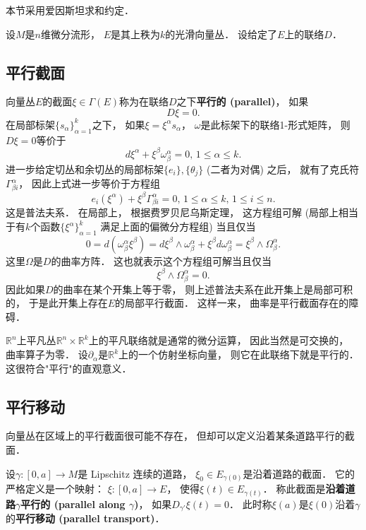 

本节采用爱因斯坦求和约定．

设$M$是$n$维微分流形， $E$是其上秩为$k$的光滑向量丛． 设给定了$E$上的联络$D$．

\subsection{平行截面}

向量丛$E$的截面$\xi\in\Gamma(E)$称为在联络$D$之下\textbf{平行的 (parallel)}， 如果
$$D\xi=0.$$
在局部标架$\{s_\alpha\}_{\alpha=1}^k$之下， 如果$\xi=\xi^\alpha s_\alpha$， $\omega$是此标架下的联络1-形式矩阵， 则$D\xi=0$等价于
$$
d\xi^\alpha+\xi^\beta\omega^\alpha_\beta=0,\,1\leq \alpha\leq k.
$$
进一步给定切丛和余切丛的局部标架$\{e_i\},\{\theta_j\}$ (二者为对偶) 之后， 就有了克氏符$\Gamma_{\beta i}^\alpha$， 因此上式进一步等价于方程组
$$
e_i(\xi^\alpha)+\xi^\beta\Gamma^\alpha_{\beta i}=0,\,1\leq \alpha\leq k,\,1\leq i\leq n.
$$
这是普法夫系． 在局部上， 根据费罗贝尼乌斯定理， 这方程组可解 (局部上相当于有$k$个函数$\{\xi^\alpha\}_{\alpha=1}^k$ 满足上面的偏微分方程组) 当且仅当
$$
0=d(\omega^\alpha_\beta\xi^\beta)=d\xi^\beta\wedge\omega^\alpha_\beta+\xi^\beta d\omega^\alpha_\beta=\xi^\beta\wedge\Omega_\beta^\alpha.
$$
这里$\Omega$是$D$的曲率方阵． 这也就表示这个方程组可解当且仅当
$$
\xi^\beta\wedge\Omega_\beta^\alpha=0.
$$
因此如果$D$的曲率在某个开集上等于零， 则上述普法夫系在此开集上是局部可积的， 于是此开集上存在$E$的局部平行截面． 这样一来， 曲率是平行截面存在的障碍．

$\mathbb{R}^n$上平凡丛$\mathbb{R}^n\times\mathbb{R}^k$上的平凡联络就是通常的微分运算， 因此当然是可交换的， 曲率算子为零． 设$\partial_\alpha$是$\mathbb{R}^k$上的一个仿射坐标向量， 则它在此联络下就是平行的． 这很符合"平行"的直观意义． 

\subsection{平行移动}
向量丛在区域上的平行截面很可能不存在， 但却可以定义沿着某条道路平行的截面． 

设$\gamma:[0,a]\to M$是 Lipschitz 连续的道路， $\xi_0\in E_{\gamma(0)}$是沿着道路的截面． 它的严格定义是一个映射： $\xi:[0,a]\to E$， 使得$\xi(t)\in E_{\gamma(t)}$． 称此截面是\textbf{沿着道路$\gamma$平行的 (parallel along $\gamma$)}， 如果$D_{\gamma'}\xi(t)=0$． 此时称$\xi(a)$是$\xi(0)$沿着$\gamma$的\textbf{平行移动 (parallel transport)}． 

